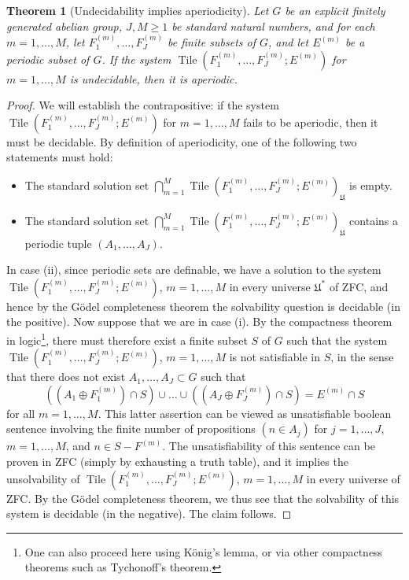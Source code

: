 \documentclass[reqno,a4paper,12pt]{amsart}
\numberwithin{equation}{section}
\numberwithin{figure}{section}
\renewcommand\geq{\geqslant}
\newcommand{\Tile}{\operatorname{Tile}}
\newcommand{\Universe}{{\mathfrak{U}}}
\theoremstyle{plain}
\newtheorem{theorem}[thm]{Theorem}
\theoremstyle{definition}
\begin{document}
\begin{theorem}[Undecidability implies aperiodicity]
Let $G$ be an explicit finitely generated abelian group, $J, M \geq 1$ be standard natural numbers, and for each $m=1,\dots,M$, let $F^{(m)}_1,\dots,F^{(m)}_J$ be finite subsets of $G$, and let $E^{(m)}$ be a periodic subset of $G$.  If the system $\Tile(F^{(m)}_1,\dots,F^{(m)}_J; E^{(m)})$ for $m=1,\dots,M$ is undecidable, then it is aperiodic.
\end{theorem}

\begin{proof}  We will establish the contrapositive: if the system $\Tile(F^{(m)}_1,\dots,F^{(m)}_J; E^{(m)})$ for $m=1,\dots,M$ fails to be aperiodic, then it must be decidable.  By definition of aperiodicity, one of the following two statements must hold:
\begin{itemize}
\item[(i)]  The standard solution set $\bigcap_{m=1}^M \Tile(F^{(m)}_1,\dots,F^{(m)}_J; E^{(m)})_\Universe$ is empty.
\item[(ii)]  The standard solution set $\bigcap_{m=1}^M \Tile(F^{(m)}_1,\dots,F^{(m)}_J; E^{(m)})_\Universe$ contains a periodic tuple $(A_1,\dots,A_J)$.
\end{itemize}
In case (ii), since periodic sets are definable, we have a solution to the system $\Tile(F^{(m)}_1,\dots,F^{(m)}_J; E^{(m)})$, $m=1,\dots,M$ in every universe $\Universe^*$ of ZFC, and hence by the G\"odel completeness theorem the solvability question is decidable (in the positive).  Now suppose that we are in case (i).  By the compactness theorem in logic\footnote{One can also proceed here using K\"onig's lemma, or via other compactness theorems such as Tychonoff's theorem.}, there must therefore exist a finite subset $S$ of $G$ such that the system $\Tile(F^{(m)}_1,\dots,F^{(m)}_J; E^{(m)})$, $m=1,\dots,M$ is not satisfiable in $S$, in the sense that there does not exist $A_1,\dots,A_J \subset G$ such that
$$ ((A_1 \oplus F^{(m)}_1) \cap S) \cup \dots \cup ((A_J \oplus F^{(m)}_J) \cap S) = E^{(m)} \cap S$$
for all $m=1,\dots,M$.  This latter assertion can be viewed as unsatisfiable boolean sentence involving the finite number of propositions $(n \in A_j)$ for $j=1,\dots,J$, $m=1,\dots,M$, and $n \in S - F^{(m)}$.  The unsatisfiability of this sentence can be proven in ZFC (simply by exhausting a truth table), and it implies the unsolvability of $\Tile(F^{(m)}_1,\dots,F^{(m)}_J; E^{(m)})$, $m=1,\dots,M$ in every universe of ZFC.  By the G\"odel completeness theorem, we thus see that the solvability of this system is decidable (in the negative).  The claim follows.
\end{proof}
\end{document}
